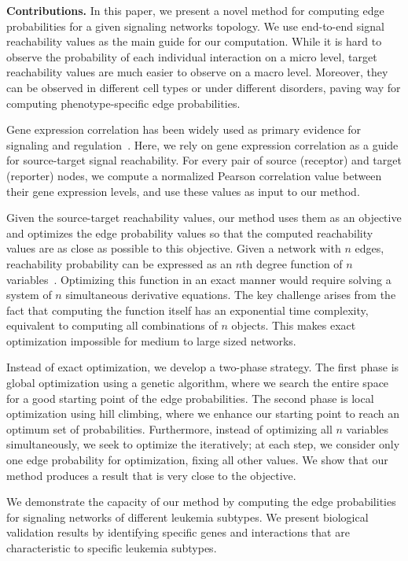 \documentclass[runningheads,a4paper]{llncs}
\begin{document}
{\bf Contributions.} In this paper, we present a novel method for computing edge
probabilities for a given signaling networks topology. We use end-to-end
signal reachability values as the main guide for our computation. While it is
hard to observe the probability of each individual interaction on a micro level,
target reachability values are much easier to observe on a macro level.
Moreover, they can be observed in different cell types or under different
disorders, paving way for computing phenotype-specific edge probabilities.

Gene expression correlation has been widely used as primary evidence for
signaling and regulation~\cite{missing}. Here, we rely on gene expression
correlation as a guide for source-target signal reachability. For every pair of
source (receptor) and target (reporter) nodes, we compute a normalized Pearson
correlation value between their gene expression levels, and use these values as
input to our method.

Given the source-target reachability values, our method uses them as an
objective and optimizes the edge probability values so that the computed
reachability values are as close as possible to this objective. Given a network
with $n$ edges, reachability probability can be expressed as an $n$th degree
function of $n$ variables~\cite{preach}. Optimizing this function in an exact
manner would require solving a system of $n$ simultaneous derivative equations.
The key challenge arises from the fact that computing the function itself has an
exponential time complexity, equivalent to computing all combinations of $n$ objects. This makes exact
optimization impossible for medium to large sized networks.

Instead of exact optimization, we develop a two-phase strategy. The first phase
is global optimization using a genetic algorithm, where we search the entire
space for a good starting point of the edge probabilities. The second phase is
local optimization using hill climbing, where we enhance our starting point to
reach an optimum set of probabilities. Furthermore, instead of optimizing all
$n$ variables simultaneously, we seek to optimize the iteratively; at each
step, we consider only one edge probability for optimization, fixing all other
values. We show that our method produces a result that is very close to the
objective.

We demonstrate the capacity of our method by computing the edge probabilities
for signaling networks of different leukemia subtypes. We present biological
validation results by identifying specific genes and interactions that are
characteristic to specific leukemia subtypes.
\end{document}
